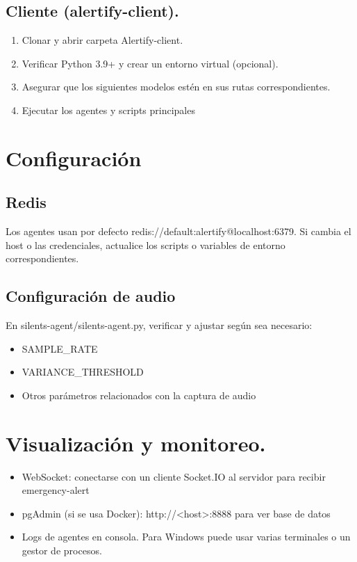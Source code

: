 \subsection*{Cliente (alertify-client).}

\begin{enumerate}
  \item Clonar y abrir carpeta Alertify-client.
  \item Verificar Python 3.9+ y crear un entorno virtual (opcional).
  \item Asegurar que los siguientes modelos estén en sus rutas correspondientes.
  \item Ejecutar los agentes y scripts principales
\end{enumerate}

\section*{Configuración}

\subsection*{Redis}

Los agentes usan por defecto redis://default:alertify@localhost:6379. Si cambia el host o las credenciales, actualice los scripts o variables de entorno correspondientes.

\subsection*{Configuración de audio}

En silents-agent/silents-agent.py, verificar y ajustar según sea necesario:

\begin{itemize}
  \item SAMPLE\_RATE
  \item VARIANCE\_THRESHOLD
  \item Otros parámetros relacionados con la captura de audio
\end{itemize}

\section*{Visualización y monitoreo.}

\begin{itemize}
  \item WebSocket: conectarse con un cliente Socket.IO al servidor para recibir emergency-alert
  \item pgAdmin (si se usa Docker): http://<host>:8888 para ver base de datos
  \item Logs de agentes en consola. Para Windows puede usar varias terminales o un gestor de procesos.
\end{itemize}

